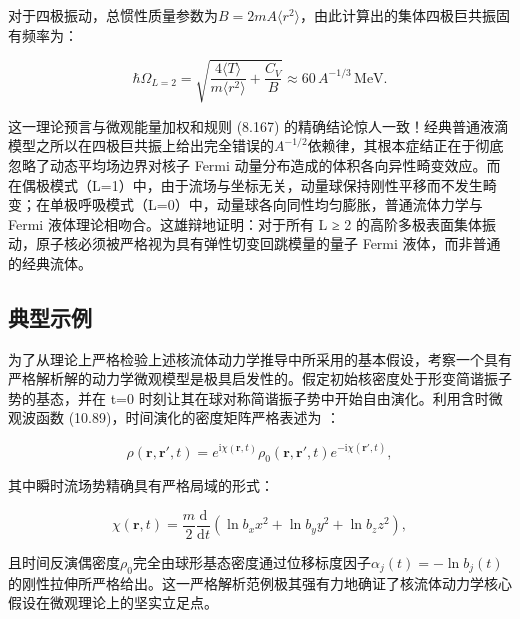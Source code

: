对于四极振动，总惯性质量参数为$B=2mA\langle r^{2}\rangle$，由此计算出的集体四极巨共振固有频率为：

\[
\hbar\Omega_{L=2}=\sqrt{\frac{4\langle T\rangle}{m\langle r^{2}\rangle}+\frac{C_{V}}{B}}\approx60\,A^{-1/3}\,\text{MeV}.
\]

这一理论预言与微观能量加权和规则 (8.167) 的精确结论惊人一致！经典普通液滴模型之所以在四极巨共振上给出完全错误的$A^{-1/2}$依赖律，其根本症结正在于彻底忽略了动态平均场边界对核子
Fermi 动量分布造成的体积各向异性畸变效应。而在偶极模式（L=1）中，由于流场与坐标无关，动量球保持刚性平移而不发生畸变；在单极呼吸模式（L=0）中，动量球各向同性均匀膨胀，普通流体力学与
Fermi 液体理论相吻合。这雄辩地证明：对于所有 L ≥ 2 的高阶多极表面集体振动，原子核必须被严格视为具有弹性切变回跳模量的量子
Fermi 液体，而非普通的经典流体。

\subsection{典型示例\label{subsec:13.3.7_=005178=00578B=00793A=004F8B}}

为了从理论上严格检验上述核流体动力学推导中所采用的基本假设，考察一个具有严格解析解的动力学微观模型是极具启发性的。假定初始核密度处于形变简谐振子势的基态，并在
t=0 时刻让其在球对称简谐振子势中开始自由演化。利用含时微观波函数 (10.89)，时间演化的密度矩阵严格表述为 \cite{BS79,SB79}：

\[
\rho(\boldsymbol{r},\boldsymbol{r}',t)=e^{\mathrm{i}\chi(\boldsymbol{r},t)}\rho_{0}(\boldsymbol{r},\boldsymbol{r}',t)e^{-\mathrm{i}\chi(\boldsymbol{r}',t)},
\]

其中瞬时流场势精确具有严格局域的形式：

\[
\chi(\boldsymbol{r},t)=\frac{m}{2}\frac{\mathrm{d}}{\mathrm{d}t}\left(\ln b_{x}x^{2}+\ln b_{y}y^{2}+\ln b_{z}z^{2}\right),
\]

且时间反演偶密度$\rho_{0}$完全由球形基态密度通过位移标度因子$\alpha_{j}(t)=-\ln b_{j}(t)$的刚性拉伸所严格给出。这一严格解析范例极其强有力地确证了核流体动力学核心假设在微观理论上的坚实立足点。
